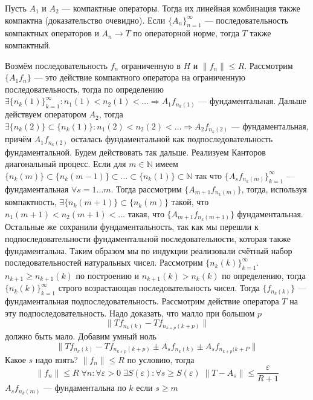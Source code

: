 \documentclass[12pt]{article}
\begin{document}
\begin{Utv}
    Пусть $A_1$ и $A_2$ --- компактные операторы.
    Тогда их линейная комбинация также компактна (доказательство очевидно).
    Если $\{A_n\}_{n = 1}^\infty$ --- последовательность компактных операторов 
    и $A_n \to T$ по операторной норме, тогда
    $T$ также компактный.
\end{Utv}
\begin{Proof}
    Возмём последовательность $f_n$ ограниченную в $H$ и $\|f_n\| \le R$.
    Рассмотрим $\{A_1 f_n\}$ --- это действие компактного оператора на 
    ограниченную последовательность, тогда по
    определению $\exists \{n_k(1)\}_{k = 1}^\infty \colon n_1(1) < n_2(1) < 
    \dots \Rightarrow A_1 f_{n_k(1)}$ ---
    фундаментальная.
    Дальше действуем оператором $A_2$, тогда $\exists \{n_k(2)\} \subset 
    \{n_k(1)\} \colon n_1(2) < n_2(2) < \dots 
    \Rightarrow A_2 f_{n_k(2)}$ --- фундаментальная, причём $A_1 f_{n_k(2)}$ 
    осталась фундаментальной как
    подпоследовательность фундаментальной.
    Будем действовать так дальше.
    Реализуем Канторов диагональный процесс.
    Если для $m \in \mathbb N$ имеем $\{n_k(m)\} \subset \{n_k(m - 1)\} 
    \subset \dots \subset \{n_k(1)\} \subset \mathbb N$
    так что $\{A_s f_{n_k(m)}\}_{k = 1}^{\infty}$ --- фундаментальная $\forall 
    s = 1 \dots m$.
    Тогда рассмотрим $\{A_{m + 1} f_{n_k(m)}\}$, тогда, используя 
    компактность, $\exists \{n_k(m + 1)\} \subset \{n_k(m)\}$
    такой, что $n_1(m + 1) < n_2(m + 1) < \dots$ такая, что $\{A_{m + 1} 
    f_{n_k(m + 1)}\}$ фундаментальная.
    Остальные же сохранили фундаментальность, так как мы перешли к 
    подпоследовательности фундаментальной 
    последовательности, которая также фундаментальна.
    Таким образом мы по индукции реализовали счётный набор последовательностей 
    натуральных чисел.
    Рассмотрим $\{n_k(k)\}_{k = 1}^\infty$.
    $n_{k + 1} \ge n_{k + 1}(k)$ по построению и $n_{k + 1}(k) > n_k(k)$ по 
    определению, тогда $\{n_k(k)\}_{k = 1}^\infty$
    строго возрастающая последовательность чисел.
    Тогда $\{f_{n_k(k)}\}$ --- фундаментальная подпоследовательность.
    Рассмотрим действие оператора $T$ на эту подпоследовательность.
    Надо доказать, что малло при большом $p$
    $$
    \|T f_{n_k(k)} - T f_{n_{k + p}(k + p)}\|
    $$
    должно быть мало.
    Добавим умный ноль
    $$
    \|T f_{n_k(k)} -T f_{n_{k + p}(k + p)} \pm A_s f_{n_k(k)} \pm 
    A_s f_{n_{k + p}(k + P}\|
    $$
    Какое $s$ надо взять?
    $\|f_n\| \le R$ по условию, тогда 
    $$
    \|f_n\| \le R\; \forall n \colon \forall
    \varepsilon > 0\; \exists S(\varepsilon)\colon \forall s \ge 
    S(\varepsilon)\; \|T - A_s\| \le \dfrac{\varepsilon}{R + 1}
    $$
    $A_s f_{n_k(m)}$ --- фундаментальна по $k$ если $s \ge m$
\end{Proof}
\end{document}

